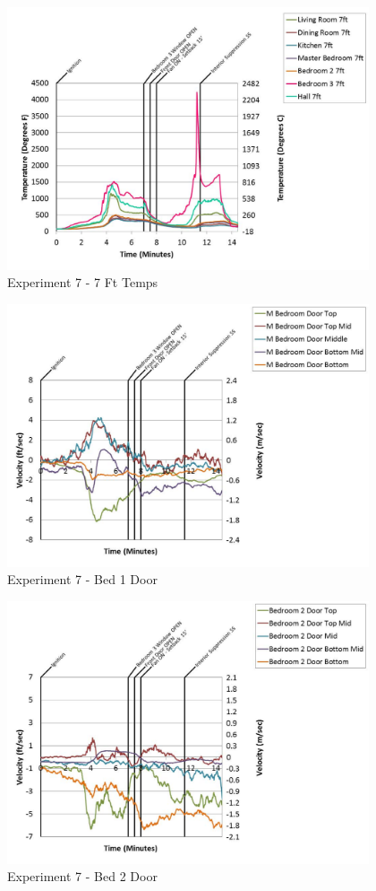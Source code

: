 \documentclass{article}
\begin{document}
\begin{appendices}
	\begin{figure}[h!]
		\centering
		\includegraphics[height=3.05in]{0_Images/Results_Charts/Exp_7_Charts/7FtTemps.pdf}
		\caption{Experiment 7 - 7 Ft Temps}
	\end{figure}
 
	\clearpage

	\begin{figure}[h!]
		\centering
		\includegraphics[height=3.05in]{0_Images/Results_Charts/Exp_7_Charts/Bed1Door.pdf}
		\caption{Experiment 7 - Bed 1 Door}
	\end{figure}
 

	\begin{figure}[h!]
		\centering
		\includegraphics[height=3.05in]{0_Images/Results_Charts/Exp_7_Charts/Bed2Door.pdf}
		\caption{Experiment 7 - Bed 2 Door}
	\end{figure}
 

\end{appendices}
\end{document}
